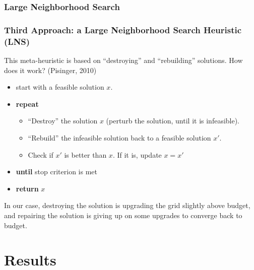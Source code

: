 \documentclass{beamer}
\begin{document}
\subsubsection{Large Neighborhood Search}
\begin{frame}
\frametitle{Third Approach: a Large Neighborhood Search Heuristic (LNS)}
This meta-heuristic is based on ``destroying'' and ``rebuilding'' solutions. How does it work? (Pisinger, 2010)
\begin{itemize}
	\item start with a feasible solution $x$.
	\item \textbf{repeat}
	\begin{itemize}
		\item ``Destroy'' the solution $x$ (perturb the solution, until it is infeasible).
		\item ``Rebuild'' the infeasible solution back to a feasible solution $x'$.
		\item Check if $x'$ is better than $x$. If it is, update $x=x'$
	\end{itemize}
\item \textbf{until} stop criterion is met
\item \textbf{return }$x$
\end{itemize}
In our case, destroying the solution is upgrading the grid slightly above budget, and repairing the solution is giving up on some upgrades to converge back to budget.
\end{frame}

\section{Results}
\end{document}

